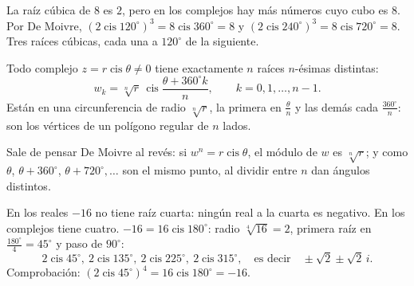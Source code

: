 \documentclass[11pt,a4paper]{article}
\let\nivelorig\nivel
\renewcommand{\nivel}[2]{\Needspace{8\baselineskip}\nivelorig{#1}{#2}}
\newcommand{\cis}{\operatorname{cis}}
\begin{document}
La raíz cúbica de $8$ es $2$, pero en los complejos hay más números cuyo cubo es $8$. Por De Moivre,
$(2\cis120^\circ)^3=8\cis360^\circ=8$ y $(2\cis240^\circ)^3=8\cis720^\circ=8$. Tres raíces cúbicas, cada una a
$120^\circ$ de la siguiente.

\begin{propiedad}
Todo complejo $z=r\cis\theta\neq0$ tiene exactamente $n$ raíces $n$-ésimas distintas:
\[ w_k=\sqrt[n]{r}\,\cis\frac{\theta+360^\circ k}{n},\qquad k=0,1,\dots,n-1. \]
Están en una circunferencia de radio $\sqrt[n]{r}$, la primera en $\tfrac{\theta}{n}$ y las demás cada $\tfrac{360^\circ}{n}$:
son los vértices de un polígono regular de $n$ lados.
\end{propiedad}
Sale de pensar De Moivre al revés: si $w^n=r\cis\theta$, el módulo de $w$ es $\sqrt[n]{r}$; y como $\theta$,
$\theta+360^\circ$, $\theta+720^\circ,\dots$ son el mismo punto, al dividir entre $n$ dan ángulos distintos.

\begin{ejemplo}
En los reales $-16$ no tiene raíz cuarta: ningún real a la cuarta es negativo. En los complejos tiene cuatro.
$-16=16\cis180^\circ$: radio $\sqrt[4]{16}=2$, primera raíz en $\tfrac{180^\circ}{4}=45^\circ$ y paso de $90^\circ$:
\[ 2\cis45^\circ,\ 2\cis135^\circ,\ 2\cis225^\circ,\ 2\cis315^\circ,\quad\text{es decir}\quad \pm\sqrt2\pm\sqrt2\,i. \]
Comprobación: $(2\cis45^\circ)^4=16\cis180^\circ=-16$.
\end{ejemplo}

\begin{figura}
\end{figura}
\end{document}
